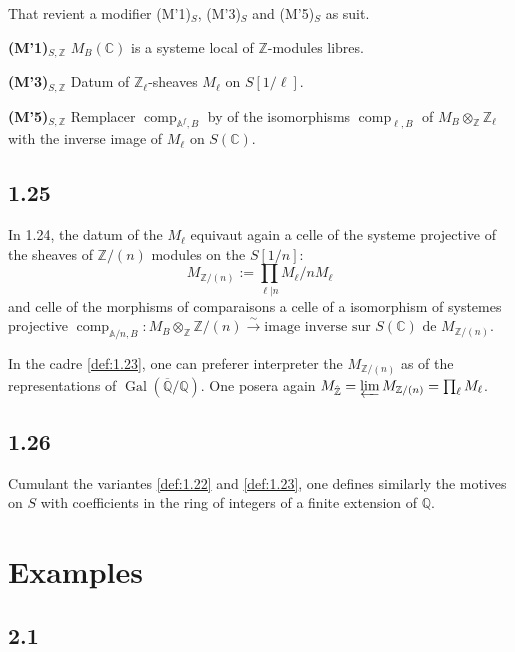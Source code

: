 \documentclass[12pt,a4paper]{article}
\theoremstyle{plain}
\theoremstyle{definition}
\theoremstyle{remark}
\DeclareMathOperator{\Gal}{Gal}
\providecommand{\Gal}{\operatorname{Gal}}
\providecommand{\limproj}{\varprojlim}
\providecommand{\comp}{\operatorname{comp}}
\begin{document}
That revient a modifier (M'1)$_S$, (M'3)$_S$ and (M'5)$_S$ as suit.

\textbf{(M'1)$_{S,\mathbb{Z}}$} $M_B(\mathbb{C})$ is a systeme local of
$\mathbb{Z}$-modules libres.

\textbf{(M'3)$_{S,\mathbb{Z}}$} Datum of $\mathbb{Z}_\ell$-sheaves $M_\ell$ on
$S[1/\ell]$.

\textbf{(M'5)$_{S,\mathbb{Z}}$} Remplacer $\comp_{\mathbb{A}^f,B}$ by of the
isomorphisms $\comp_{\ell,B}$ of $M_B \otimes_{\mathbb{Z}} \mathbb{Z}_\ell$ with the inverse image of $M_\ell$ on $S(\mathbb{C})$.

\subsection*{1.25}

In 1.24, the datum of the $M_\ell$ equivaut again a celle of the systeme projective
of the sheaves of $\mathbb{Z}/(n)$ modules on the $S[1/n]$:
\[
M_{\mathbb{Z}/(n)} := \prod_{\ell|n} M_\ell/nM_\ell
\]
and celle of the morphisms of comparaisons a celle of a isomorphism of systemes
projective $\comp_{\mathbb{A}/n,B}: M_B \otimes_{\mathbb{Z}} \mathbb{Z}/(n)
\xrightarrow{\sim} \text{image inverse sur } S(\mathbb{C}) \text{ de }
M_{\mathbb{Z}/(n)}$.

In the cadre \ref{def:1.23}, one can preferer interpreter the
$M_{\mathbb{Z}/(n)}$ as of the representations of $\Gal(\overline{\mathbb{Q}}/\mathbb{Q})$.
One posera again $M_{\hat{\mathbb{Z}}} = \limproj M_{\mathbb{Z}/(n)} = \prod_\ell
M_\ell$.

\subsection*{1.26}

Cumulant the variantes \ref{def:1.22} and \ref{def:1.23}, one defines similarly the
motives on $S$ with coefficients in the ring of integers of a finite extension of
$\mathbb{Q}$.

\section{Examples}\label{sec:2}

\subsection*{2.1}
\end{document}
